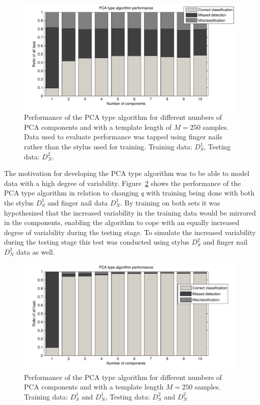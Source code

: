\begin{figure}[!] %
\centering
\includegraphics[width=150mm]{PCAperformNail.pdf}
\caption{Performance of the PCA type algorithm for different numbers of PCA components and with a template length of $M=250$ samples. Data used to evaluate performance was tapped using finger nails rather than the stylus used for training. Training data: $D^1_S$, Testing data: $D^2_N$.}\label{fig:PCAperformNail}
\end{figure}

The motivation for developing the PCA type algorithm was to be able to model data with a high degree of variability. Figure~\ref{fig:PCAperform_SN-SN} shows the performance of the PCA type algorithm in relation to changing $q$ with training being done with both the stylus $D^1_S$ and finger nail data $D^1_N$. By training on both sets it was hypothesized that the increased variability in the training data would be mirrored in the components, enabling the algorithm to cope with an equally increased degree of variability during the testing stage. To simulate the increased variability during the testing stage this test was conducted using stylus $D^2_S$ and finger nail $D^2_N$ data as well.

\begin{figure}[!] %
\centering
\includegraphics[width=150mm]{PCAperform_SN-SN.pdf}
\caption{Performance of the PCA type algorithm for different numbers of PCA components and with a template length $M=250$ samples. Training data: $D^1_S$ and $D^1_N$, Testing data: $D^2_S$ and $D^2_N$}\label{fig:PCAperform_SN-SN}
\end{figure}

